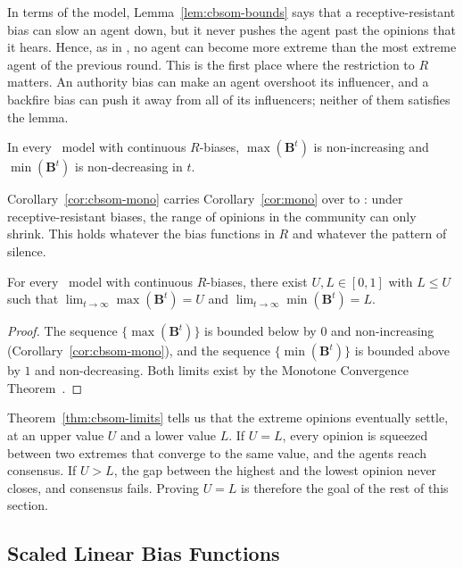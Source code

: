 In terms of the model, Lemma~\ref{lem:cbsom-bounds} says that a
receptive-resistant bias can slow an agent down, but it never pushes the
agent past the opinions that it hears. Hence, as in \SOMminus, no agent
can become more extreme than the most extreme agent of the previous
round. This is the first place where the restriction to $R$ matters. An
authority bias can make an agent overshoot its influencer, and a backfire
bias can push it away from all of its influencers; neither of them
satisfies the lemma.

\begin{corollary}
\label{cor:cbsom-mono}
  In every \CBSOMminus\ model with continuous $R$-biases,
  $\max(\mathbf{B}^t)$ is non-increasing and
  $\min(\mathbf{B}^t)$ is non-decreasing in $t$.
\end{corollary}

Corollary~\ref{cor:cbsom-mono} carries Corollary~\ref{cor:mono} over to
\CBSOMminus: under receptive-resistant biases, the range of opinions in
the community can only shrink. This holds whatever the bias functions in
$R$ and whatever the pattern of silence.

\begin{theorem}
\label{thm:cbsom-limits}
  For every \CBSOMminus\ model with continuous $R$-biases, there exist
  $U,L\in[0,1]$ with $L\le U$ such that
  $\lim_{t\to\infty}\max(\mathbf{B}^t)=U$ and
  $\lim_{t\to\infty}\min(\mathbf{B}^t)=L$.
\end{theorem}

\begin{proof}
  The sequence $\{\max(\mathbf{B}^t)\}$ is bounded below by $0$ and
  non-increasing (Corollary~\ref{cor:cbsom-mono}), and the sequence
  $\{\min(\mathbf{B}^t)\}$ is bounded above by $1$ and non-decreasing.
  Both limits exist by the Monotone Convergence
  Theorem~\cite{Houshang2014}.
\end{proof}

Theorem~\ref{thm:cbsom-limits} tells us that the extreme opinions
eventually settle, at an upper value $U$ and a lower value $L$. If $U=L$,
every opinion is squeezed between two extremes that converge to the same
value, and the agents reach consensus. If $U>L$, the gap between the
highest and the lowest opinion never closes, and consensus fails. Proving
$U=L$ is therefore the goal of the rest of this section.

\FloatBarrier
\subsection{Scaled Linear Bias Functions}
\label{sec:scaled-linear}

